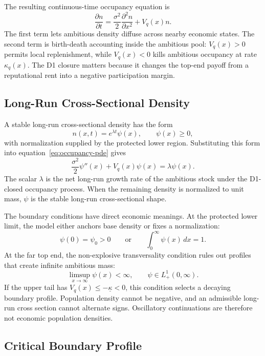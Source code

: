 The resulting continuous-time occupancy equation is
\begin{equation}
\frac{\partial n}{\partial t}
=
\frac{\sigma^2}{2}\frac{\partial^2 n}{\partial x^2}
+V_q(x)n.
\label{eq:occupancy-pde}
\end{equation}
The first term lets ambitious density diffuse across nearby economic states. The second term is birth-death accounting inside the ambitious pool: \(V_q(x)>0\) permits local replenishment, while \(V_q(x)<0\) kills ambitious occupancy at rate \(\kappa_q(x)\). The D1 closure matters because it changes the top-end payoff from a reputational rent into a negative participation margin.

\subsection{Long-Run Cross-Sectional Density}

A stable long-run cross-sectional density has the form
\[
n(x,t)=e^{\lambda t}\psi(x),
\qquad
\psi(x)\ge0,
\]
with normalization supplied by the protected lower region. Substituting this form into equation~\eqref{eq:occupancy-pde} gives
\begin{equation}
\frac{\sigma^2}{2}\psi''(x)+V_q(x)\psi(x)=\lambda\psi(x).
\label{eq:stationary-density-eigen}
\end{equation}
The scalar \(\lambda\) is the net long-run growth rate of the ambitious stock under the D1-closed occupancy process. When the remaining density is normalized to unit mass, \(\psi\) is the stable long-run cross-sectional shape.

The boundary conditions have direct economic meanings. At the protected lower limit, the model either anchors base density or fixes a normalization:
\[
\psi(0)=\psi_0>0
\qquad\text{or}\qquad
\int_0^\infty \psi(x)\,dx=1.
\]
At the far top end, the non-explosive transversality condition rules out profiles that create infinite ambitious mass:
\[
\limsup_{x\to\infty}\psi(x)<\infty,
\qquad
\psi\in L^1_+(0,\infty).
\]
If the upper tail has \(V_q(x)\le -\underline\kappa<0\), this condition selects a decaying boundary profile. Population density cannot be negative, and an admissible long-run cross section cannot alternate signs. Oscillatory continuations are therefore not economic population densities.

\subsection{Critical Boundary Profile}

